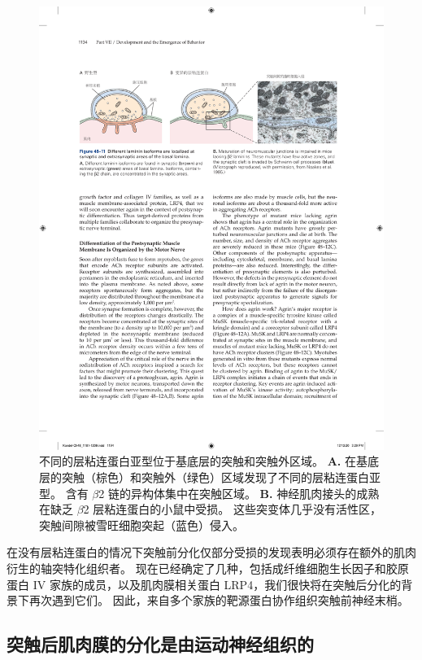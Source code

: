 \begin{figure}[htbp]
	\centering
	\includegraphics[width=0.9\linewidth]{chap48/fig_48_11}
	\caption{不同的层粘连蛋白亚型位于基底层的突触和突触外区域。
		\textbf{A.} 在基底层的突触（棕色）和突触外（绿色）区域发现了不同的层粘连蛋白亚型。
		含有 $\beta$2 链的异构体集中在突触区域。 
		\textbf{B.} 神经肌肉接头的成熟在缺乏 $\beta$2 层粘连蛋白的小鼠中受损。
		这些突变体几乎没有活性区，突触间隙被雪旺细胞突起（蓝色）侵入\cite{noakes1995aberrant}。}
	\label{fig:48_11}
\end{figure}


在没有层粘连蛋白的情况下突触前分化仅部分受损的发现表明必须存在额外的肌肉衍生的轴突特化组织者。
现在已经确定了几种，包括成纤维细胞生长因子和胶原蛋白 IV 家族的成员，以及肌肉膜相关蛋白 LRP4，我们很快将在突触后分化的背景下再次遇到它们。
因此，来自多个家族的靶源蛋白协作组织突触前神经末梢。



\subsection{突触后肌肉膜的分化是由运动神经组织的}

